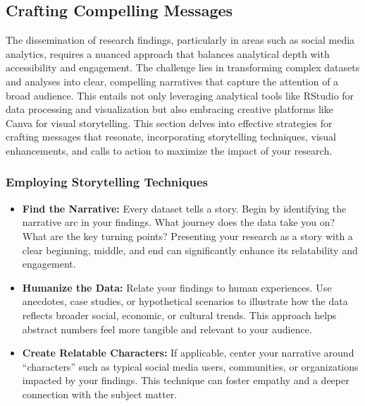 \documentclass[
]{book}
\begin{document}
\hypertarget{crafting-compelling-messages}{%
\subsection*{Crafting Compelling Messages}\label{crafting-compelling-messages}}

The dissemination of research findings, particularly in areas such as social media analytics, requires a nuanced approach that balances analytical depth with accessibility and engagement. The challenge lies in transforming complex datasets and analyses into clear, compelling narratives that capture the attention of a broad audience. This entails not only leveraging analytical tools like RStudio for data processing and visualization but also embracing creative platforms like Canva for visual storytelling. This section delves into effective strategies for crafting messages that resonate, incorporating storytelling techniques, visual enhancements, and calls to action to maximize the impact of your research.

\hypertarget{employing-storytelling-techniques}{%
\subsubsection*{Employing Storytelling Techniques}\label{employing-storytelling-techniques}}

\begin{itemize}
\item
  \textbf{Find the Narrative:} Every dataset tells a story. Begin by identifying the narrative arc in your findings. What journey does the data take you on? What are the key turning points? Presenting your research as a story with a clear beginning, middle, and end can significantly enhance its relatability and engagement.
\item
  \textbf{Humanize the Data:} Relate your findings to human experiences. Use anecdotes, case studies, or hypothetical scenarios to illustrate how the data reflects broader social, economic, or cultural trends. This approach helps abstract numbers feel more tangible and relevant to your audience.
\item
  \textbf{Create Relatable Characters:} If applicable, center your narrative around ``characters'' such as typical social media users, communities, or organizations impacted by your findings. This technique can foster empathy and a deeper connection with the subject matter.
\end{itemize}
\end{document}
